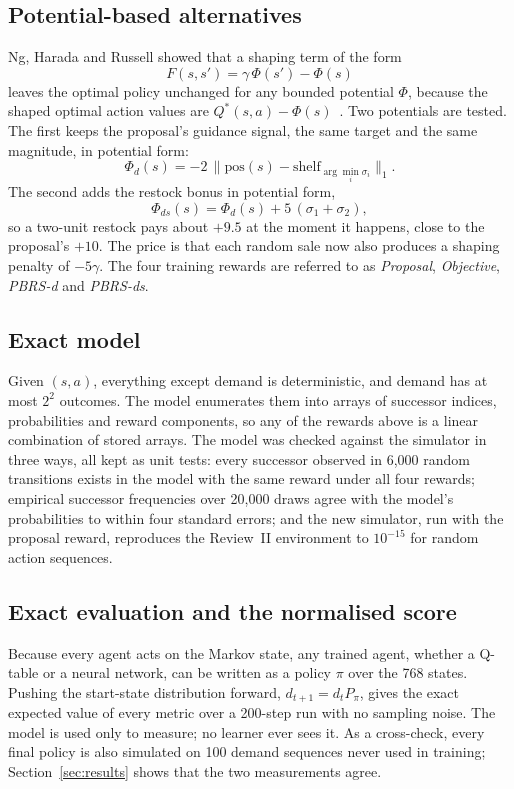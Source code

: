 \subsection{Potential-based alternatives}
Ng, Harada and Russell showed that a shaping term of the form
\begin{equation}
F(s,s') = \gamma\,\Phi(s') - \Phi(s)
\label{eq:pbrs}
\end{equation}
leaves the optimal policy unchanged for any bounded potential $\Phi$, because the shaped optimal action values are $Q^\ast(s,a)-\Phi(s)$~\cite{ng1999}. Two potentials are tested. The first keeps the proposal's guidance signal, the same target and the same magnitude, in potential form:
\begin{equation}
\Phi_{d}(s) = -2\, \lVert \text{pos}(s) - \text{shelf}_{\arg\min_i \sigma_i}\rVert_1 .
\end{equation}
The second adds the restock bonus in potential form,
\begin{equation}
\Phi_{ds}(s) = \Phi_d(s) + 5\,(\sigma_1+\sigma_2) ,
\end{equation}
so a two-unit restock pays about $+9.5$ at the moment it happens, close to the proposal's $+10$. The price is that each random sale now also produces a shaping penalty of $-5\gamma$. The four training rewards are referred to as \emph{Proposal}, \emph{Objective}, \emph{PBRS-d} and \emph{PBRS-ds}.

\subsection{Exact model}
Given $(s,a)$, everything except demand is deterministic, and demand has at most $2^2$ outcomes. The model enumerates them into arrays of successor indices, probabilities and reward components, so any of the rewards above is a linear combination of stored arrays. The model was checked against the simulator in three ways, all kept as unit tests: every successor observed in 6{,}000 random transitions exists in the model with the same reward under all four rewards; empirical successor frequencies over 20{,}000 draws agree with the model's probabilities to within four standard errors; and the new simulator, run with the proposal reward, reproduces the Review~II environment to $10^{-15}$ for random action sequences.

\subsection{Exact evaluation and the normalised score}
\label{sec:score}
Because every agent acts on the Markov state, any trained agent, whether a Q-table or a neural network, can be written as a policy $\pi$ over the 768 states. Pushing the start-state distribution forward, $d_{t+1}=d_t P_\pi$, gives the exact expected value of every metric over a 200-step run with no sampling noise. The model is used only to measure; no learner ever sees it. As a cross-check, every final policy is also simulated on 100 demand sequences never used in training; Section~\ref{sec:results} shows that the two measurements agree.

